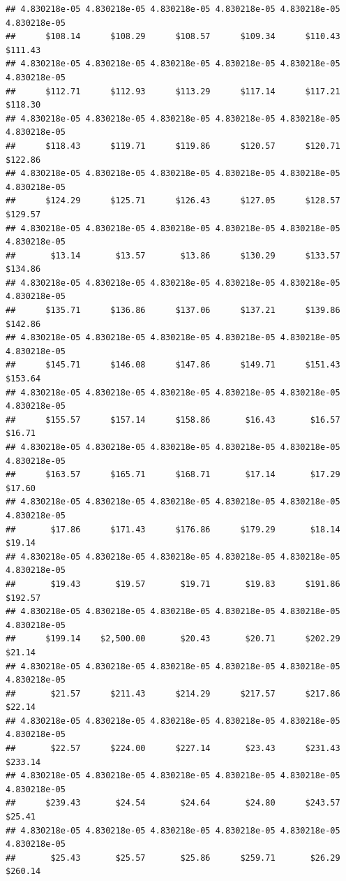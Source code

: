 \begin{verbatim}
## 4.830218e-05 4.830218e-05 4.830218e-05 4.830218e-05 4.830218e-05 4.830218e-05 
##      $108.14      $108.29      $108.57      $109.34      $110.43      $111.43 
## 4.830218e-05 4.830218e-05 4.830218e-05 4.830218e-05 4.830218e-05 4.830218e-05 
##      $112.71      $112.93      $113.29      $117.14      $117.21      $118.30 
## 4.830218e-05 4.830218e-05 4.830218e-05 4.830218e-05 4.830218e-05 4.830218e-05 
##      $118.43      $119.71      $119.86      $120.57      $120.71      $122.86 
## 4.830218e-05 4.830218e-05 4.830218e-05 4.830218e-05 4.830218e-05 4.830218e-05 
##      $124.29      $125.71      $126.43      $127.05      $128.57      $129.57 
## 4.830218e-05 4.830218e-05 4.830218e-05 4.830218e-05 4.830218e-05 4.830218e-05 
##       $13.14       $13.57       $13.86      $130.29      $133.57      $134.86 
## 4.830218e-05 4.830218e-05 4.830218e-05 4.830218e-05 4.830218e-05 4.830218e-05 
##      $135.71      $136.86      $137.06      $137.21      $139.86      $142.86 
## 4.830218e-05 4.830218e-05 4.830218e-05 4.830218e-05 4.830218e-05 4.830218e-05 
##      $145.71      $146.08      $147.86      $149.71      $151.43      $153.64 
## 4.830218e-05 4.830218e-05 4.830218e-05 4.830218e-05 4.830218e-05 4.830218e-05 
##      $155.57      $157.14      $158.86       $16.43       $16.57       $16.71 
## 4.830218e-05 4.830218e-05 4.830218e-05 4.830218e-05 4.830218e-05 4.830218e-05 
##      $163.57      $165.71      $168.71       $17.14       $17.29       $17.60 
## 4.830218e-05 4.830218e-05 4.830218e-05 4.830218e-05 4.830218e-05 4.830218e-05 
##       $17.86      $171.43      $176.86      $179.29       $18.14       $19.14 
## 4.830218e-05 4.830218e-05 4.830218e-05 4.830218e-05 4.830218e-05 4.830218e-05 
##       $19.43       $19.57       $19.71       $19.83      $191.86      $192.57 
## 4.830218e-05 4.830218e-05 4.830218e-05 4.830218e-05 4.830218e-05 4.830218e-05 
##      $199.14    $2,500.00       $20.43       $20.71      $202.29       $21.14 
## 4.830218e-05 4.830218e-05 4.830218e-05 4.830218e-05 4.830218e-05 4.830218e-05 
##       $21.57      $211.43      $214.29      $217.57      $217.86       $22.14 
## 4.830218e-05 4.830218e-05 4.830218e-05 4.830218e-05 4.830218e-05 4.830218e-05 
##       $22.57      $224.00      $227.14       $23.43      $231.43      $233.14 
## 4.830218e-05 4.830218e-05 4.830218e-05 4.830218e-05 4.830218e-05 4.830218e-05 
##      $239.43       $24.54       $24.64       $24.80      $243.57       $25.41 
## 4.830218e-05 4.830218e-05 4.830218e-05 4.830218e-05 4.830218e-05 4.830218e-05 
##       $25.43       $25.57       $25.86      $259.71       $26.29      $260.14 

\end{verbatim}
